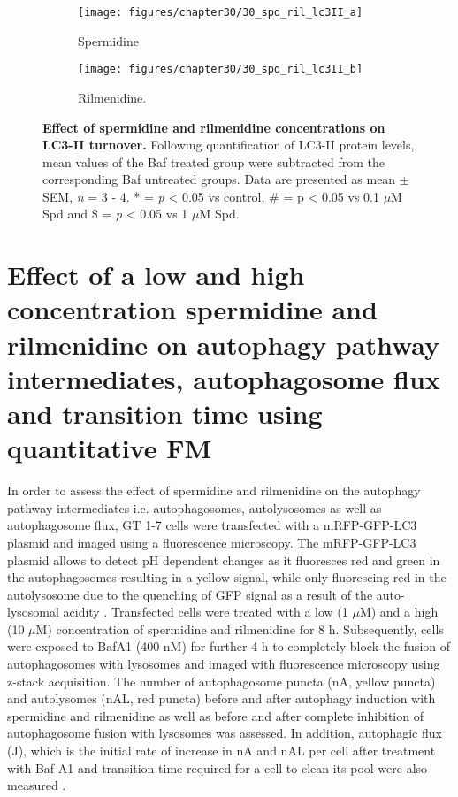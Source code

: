 {\begin{figure}[!htbp]
  \centering
  \begin{subfigure}[b]{0.495\linewidth}
    \texttt{[image: figures/chapter30/30\_spd\_ril\_lc3II\_a]}
    \caption{Spermidine}
  \end{subfigure}
  \begin{subfigure}[b]{0.495\linewidth}
    \texttt{[image: figures/chapter30/30\_spd\_ril\_lc3II\_b]}
    \caption{Rilmenidine.}
  \end{subfigure}
  \caption[Effect of spermidine and rilmenidine concentrations on LC3-II turnover]{\textbf{Effect of spermidine and rilmenidine concentrations on LC3-II turnover.} Following quantification of LC3-II protein levels, mean values of the Baf treated group were subtracted from the corresponding Baf untreated groups. Data are presented as mean $\pm$ SEM, \textit{n} = 3 - 4. * = \textit{p} < 0.05 vs control, \# = p < 0.05 vs 0.1 $\mu$M Spd and \$ = \textit{p} < 0.05 vs 1 $\mu$M Spd.}
  \label{fig:30_spd_ril_lc3ii}
\end{figure}

\section{Effect of a low and high concentration spermidine and rilmenidine on autophagy pathway intermediates, autophagosome flux and transition time using quantitative FM}
In order to assess the effect of spermidine and rilmenidine on the autophagy pathway intermediates i.e. autophagosomes, autolysosomes as well as autophagosome flux, GT 1-7 cells were transfected with a mRFP-GFP-LC3 plasmid \citep{yoshii2017} and imaged using a fluorescence microscopy. The mRFP-GFP-LC3 plasmid allows to detect pH dependent changes as it fluoresces red and green in the autophagosomes resulting in a yellow signal, while only fluorescing red in the autolysosome due to the quenching of GFP signal as a result of the auto-lysosomal acidity \citep{yoshii2017}. Transfected cells were treated with a low (1 $\mu$M) and a high (10 $\mu$M) concentration of spermidine and rilmenidine for 8 h. Subsequently, cells were exposed to BafA1 (400 nM) for further 4 h to completely block the fusion of autophagosomes with lysosomes \citep{DuToit2018b} and imaged with fluorescence microscopy using z-stack acquisition. The number of autophagosome puncta (nA, yellow puncta) and autolysomes (nAL, red puncta) before and after autophagy induction with spermidine and rilmenidine as well as before and after complete inhibition of autophagosome fusion with lysosomes was assessed. In addition, autophagic flux (J), which is the initial rate of increase in nA and nAL per cell after treatment with Baf A1 and transition time required for a cell to clean its pool were also measured \citep{DuToit2018a,DuToit2018b,loos2014}.

}
